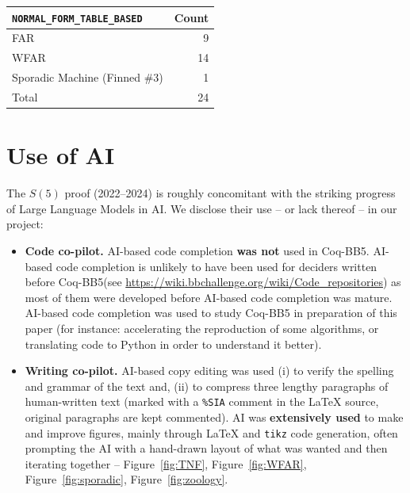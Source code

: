 \documentclass[letterpaper,british,11pt]{article}
\theoremstyle{definition} %
\numberwithin{equation}{section}
\theoremstyle{definition} %
\newcommand{\CoqBB}{Coq-BB5\xspace}
\begin{document}
\begin{table}[H]
\begin{minipage}{0.35\linewidth}
\begin{tabular}{|lr|}
            \hline
            \texttt{NORMAL\_FORM\_TABLE\_BASED} & Count \\
            \hline
            FAR                                 & 9     \\
            WFAR                                & 14    \\
            Sporadic Machine (Finned \#3)       & 1     \\
            \hline
            Total                               & 24    \\
            \hline
        \end{tabular}
    \end{minipage}
\end{table}

\vspace{-1em}
\section{Use of AI}

The $S(5)$ proof (2022--2024) is roughly concomitant with the striking progress of Large Language Models in AI. We disclose their use -- or lack thereof -- in our project:

\begin{itemize}
    \item \textbf{Code co-pilot.} AI-based code completion \textbf{was not} used in \CoqBB. AI-based code completion is unlikely to have been used for deciders written before \CoqBB (see \url{https://wiki.bbchallenge.org/wiki/Code_repositories}) as most of them were developed before AI-based code completion was mature. AI-based code completion was used to study \CoqBB in preparation of this paper (for instance: accelerating the reproduction of some algorithms, or translating \Coq code to Python in order to understand it better).
    \item \textbf{Writing co-pilot.} AI-based copy editing was used (i) to verify the spelling and grammar of the text and, (ii) to compress three lengthy paragraphs of human-written text (marked with a \texttt{\%SIA} comment in the LaTeX source, original paragraphs are kept commented). AI was \textbf{extensively used} to make and improve figures, mainly through LaTeX and \texttt{tikz} code generation, often prompting the AI with a hand-drawn layout of what was wanted and then iterating together -- \eg Figure~\ref{fig:TNF}, Figure~\ref{fig:WFAR}, Figure~\ref{fig:sporadic}, Figure~\ref{fig:zoology}.

\end{itemize}
\end{document}

